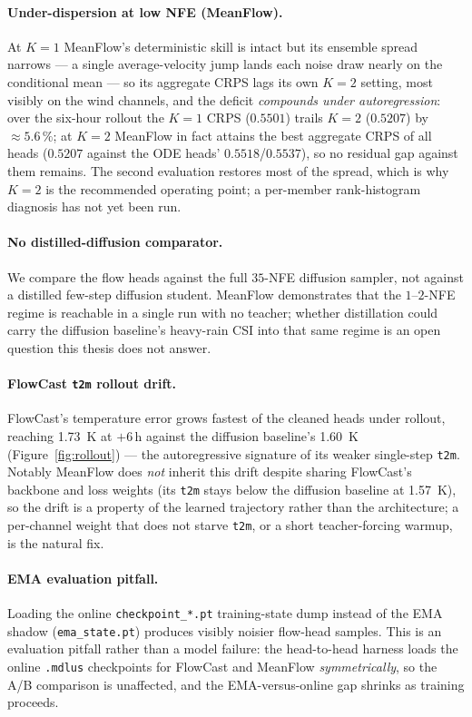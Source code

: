 \paragraph{Under-dispersion at low NFE (MeanFlow).} At $K = 1$ MeanFlow's deterministic skill is intact but its ensemble spread narrows --- a single average-velocity jump lands each noise draw nearly on the conditional mean --- so its aggregate CRPS lags its own $K = 2$ setting, most visibly on the wind channels, and the deficit \emph{compounds under autoregression}: over the six-hour rollout the $K = 1$ CRPS ($0.5501$) trails $K = 2$ ($0.5207$) by $\approx 5.6\,\%$; at $K = 2$ MeanFlow in fact attains the best aggregate CRPS of all heads ($0.5207$ against the ODE heads' $0.5518$/$0.5537$), so no residual gap against them remains. The second evaluation restores most of the spread, which is why $K = 2$ is the recommended operating point; a per-member rank-histogram diagnosis has not yet been run.

\paragraph{No distilled-diffusion comparator.} We compare the flow heads against the full $35$-NFE diffusion sampler, not against a distilled few-step diffusion student. MeanFlow demonstrates that the $1$--$2$-NFE regime is reachable in a single run with no teacher; whether distillation could carry the diffusion baseline's heavy-rain CSI into that same regime is an open question this thesis does not answer.

\paragraph{FlowCast \texttt{t2m} rollout drift.} FlowCast's temperature error grows fastest of the cleaned heads under rollout, reaching \SI{1.73}{\kelvin} at $+6$\,h against the diffusion baseline's \SI{1.60}{\kelvin} (Figure~\ref{fig:rollout}) --- the autoregressive signature of its weaker single-step \texttt{t2m}. Notably MeanFlow does \emph{not} inherit this drift despite sharing FlowCast's backbone and loss weights (its \texttt{t2m} stays below the diffusion baseline at \SI{1.57}{\kelvin}), so the drift is a property of the learned trajectory rather than the architecture; a per-channel weight that does not starve \texttt{t2m}, or a short teacher-forcing warmup, is the natural fix.

\paragraph{EMA evaluation pitfall.} Loading the online \texttt{checkpoint\_*.pt} training-state dump instead of the EMA shadow (\texttt{ema\_state.pt}) produces visibly noisier flow-head samples. This is an evaluation pitfall rather than a model failure: the head-to-head harness loads the online \texttt{.mdlus} checkpoints for FlowCast and MeanFlow \emph{symmetrically}, so the A/B comparison is unaffected, and the EMA-versus-online gap shrinks as training proceeds.

